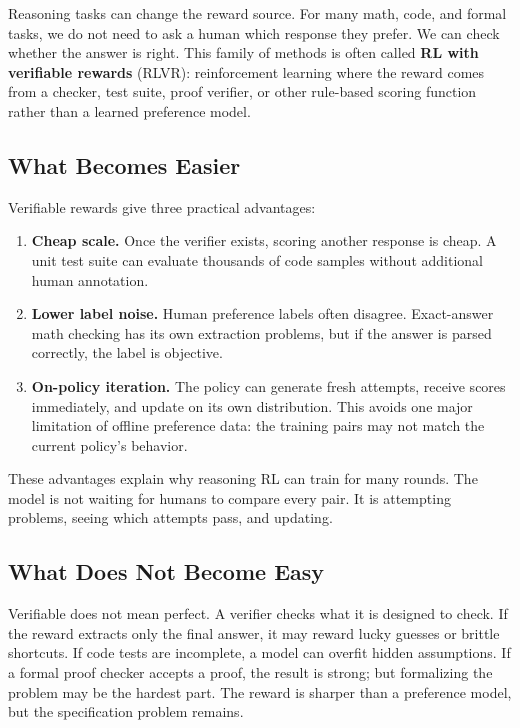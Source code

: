 Reasoning tasks can change the reward source. For many math, code, and formal tasks, we do not need to ask a human which response they prefer. We can check whether the answer is right. This family of methods is often called \textbf{RL with verifiable rewards} (RLVR): reinforcement learning where the reward comes from a checker, test suite, proof verifier, or other rule-based scoring function rather than a learned preference model.

\subsection{What Becomes Easier}

Verifiable rewards give three practical advantages:

\begin{enumerate}[nosep]
  \item \textbf{Cheap scale.} Once the verifier exists, scoring another response is cheap. A unit test suite can evaluate thousands of code samples without additional human annotation.
  \item \textbf{Lower label noise.} Human preference labels often disagree. Exact-answer math checking has its own extraction problems, but if the answer is parsed correctly, the label is objective.
  \item \textbf{On-policy iteration.} The policy can generate fresh attempts, receive scores immediately, and update on its own distribution. This avoids one major limitation of offline preference data: the training pairs may not match the current policy's behavior.
\end{enumerate}

These advantages explain why reasoning RL can train for many rounds. The model is not waiting for humans to compare every pair. It is attempting problems, seeing which attempts pass, and updating.

\subsection{What Does Not Become Easy}

Verifiable does not mean perfect. A verifier checks what it is designed to check. If the reward extracts only the final answer, it may reward lucky guesses or brittle shortcuts. If code tests are incomplete, a model can overfit hidden assumptions. If a formal proof checker accepts a proof, the result is strong; but formalizing the problem may be the hardest part. The reward is sharper than a preference model, but the specification problem remains.

